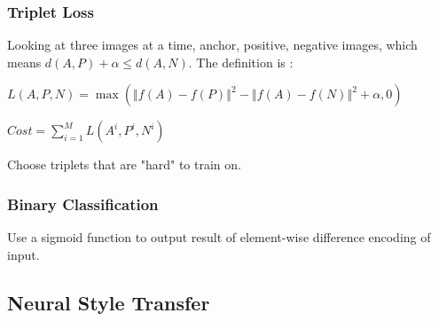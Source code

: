 \documentclass{article}
\begin{document}
		\subsubsection{Triplet Loss}
			\begin{flushleft}
				Looking at three images at a time, anchor, positive, negative images, which means $d(A,P) + \alpha \leq d(A,N)$. The definition is :
			\end{flushleft}
			\begin{center}
				$L(A,P,N) = \max(\left\Vert f(A) - f(P) \right\Vert^2 - \left\Vert f(A) - f(N) \right\Vert^2 + \alpha, 0)$
			\end{center}
			\begin{center}
				$Cost = \sum_{i=1}^M L(A^i, P^i, N^i)$
			\end{center}
			\begin{flushleft}
				Choose triplets that are "hard" to train on. 
			\end{flushleft}
		\subsubsection{Binary Classification}
			\begin{flushleft}
				Use a sigmoid function to output result of element-wise difference encoding of input.
			\end{flushleft}
	\subsection{Neural Style Transfer}
	
\end{document}
